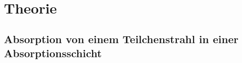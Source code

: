 
\section{Theorie}
\label{sec:Theorie}

\subsection{Absorption von einem Teilchenstrahl in einer Absorptionsschicht}

